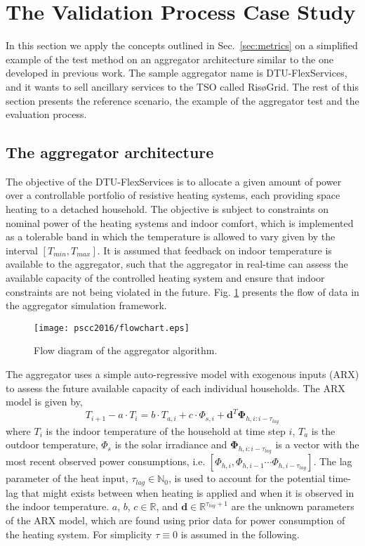 \section{The Validation Process Case Study}

In this section we apply the concepts outlined in Sec.~\ref{sec:metrics} on a simplified example of the test method on an aggregator architecture similar to the one developed in previous work\cite{thavlov2013aggregation}. The sample aggregator name is  DTU-FlexServices, and it wants to sell ancillary services to the TSO called RisøGrid. The rest of this section presents the reference scenario, the example of the aggregator test and the evaluation process. 

\subsection{The aggregator architecture}
The objective of the DTU-FlexServices is to allocate a given amount of power over a controllable portfolio of resistive heating systems, each providing space heating to a detached household. The objective is subject to constraints on nominal power of the heating systems and indoor comfort, which is implemented as a tolerable band in which the temperature is allowed to vary given by the interval $\left[T_{min},T_{max}\right]$. It is assumed that feedback on indoor temperature is available to the aggregator, such that the aggregator in real-time can assess the available capacity of the controlled heating system and ensure that indoor constraints are not being violated in the future. Fig. \ref{fig:flow_diagram} presents the flow of data in the aggregator simulation framework. 
\begin{figure}[!t]
\centering
\texttt{[image: pscc2016/flowchart.eps]}
\caption{Flow diagram of the aggregator algorithm.}
\label{fig:flow_diagram}
\end{figure}
The aggregator uses a simple auto-regressive model with exogenous inputs (ARX) to assess the future available capacity of each individual households. The ARX model is given by,
\begin{equation}\label{eq:capacity}
  T_{i+1} - a\cdot T_i = b \cdot T_{a,i} + c \cdot \Phi_{s,i} + \boldsymbol{d}^T \boldsymbol{\Phi}_{h,i:i-\tau_{lag}}
\end{equation} 
where $T_i$ is the indoor temperature of the household at time step $i$, $T_a$ is the outdoor temperature, $\Phi_s$ is the solar irradiance and $\boldsymbol{\Phi}_{h,i:i-\tau_{lag}}$ is a vector with the most recent observed power consumptions, i.e. $\left[\Phi_{h,i},\Phi_{h,i-1} \cdots \Phi_{h,i-\tau_{lag}}\right]$. The lag parameter of the heat input, $\tau_{lag}\in\mathbb{N}_0$, is used to account for the potential time-lag that might exists between when heating is applied and when it is observed in the indoor temperature. $a$, $b$, $c\in\mathbb{R}$, and $\boldsymbol{d}\in\mathbb{R}^{\tau_{lag}+1}$ are the unknown parameters of the ARX model, which are found using prior data for power consumption of the heating system. For simplicity $\tau\equiv 0$ is assumed in the following. 

